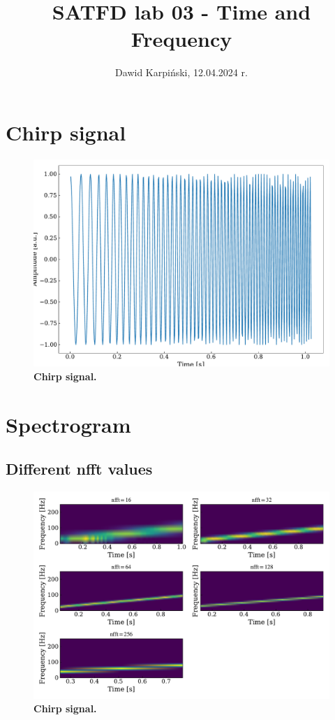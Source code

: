 \documentclass[13pt,a4paper]{article}
\begin{document}
\title{
    \LARGE
    \textbf{SATFD lab 03 - Time and Frequency}
}
\author{
    \large
    Dawid Karpiński, 12.04.2024 r.
}
\date{}
\maketitle

\section{Chirp signal}

\begin{figure}[ht!]
    \centering
    \caption{\textbf{Chirp signal.}}
    \includegraphics[width=\linewidth]{chirp.pdf}
\end{figure}

\section{Spectrogram}

\subsection{Different nfft values}

\begin{figure}[ht!]
    \centering
    \caption{\textbf{Chirp signal.}}
    \includegraphics[width=\linewidth]{spectrogram_nfft.pdf}
\end{figure}
\end{document}

